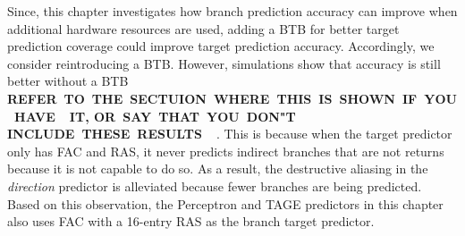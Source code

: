 Since, this chapter investigates how branch prediction accuracy can improve when additional hardware resources are used, adding a BTB for better target prediction coverage could improve target prediction accuracy. Accordingly, we consider reintroducing a BTB. However, simulations show that accuracy is still better without a BTB \textbf{REFER\ TO\ THE\ SECTUION\ WHERE\ THIS\ IS\ SHOWN\ IF\ YOU\ HAVE\ \ IT, OR\ SAY\ THAT\ YOU\ DON"T INCLUDE\ THESE\ RESULTS\ \ }. This is because when the target predictor only has FAC and RAS, it never predicts indirect branches that are not returns because it is not capable to do so. As a result, the destructive aliasing in the \textit{direction} predictor is alleviated because fewer branches are being predicted. Based on this observation, the Perceptron and TAGE predictors in this chapter also uses FAC with a 16-entry RAS as the branch target predictor.



